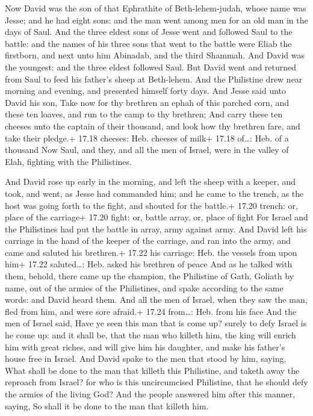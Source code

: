  Now David was the son of that Ephrathite of
Beth-lehem-judah, whose name was Jesse; and he had eight sons: and the
man went among men for an old man in the days of Saul.  And
the three eldest sons of Jesse went and followed Saul to the battle: and
the names of his three sons that went to the battle were Eliab the
firstborn, and next unto him Abinadab, and the third Shammah.
 And David was the youngest: and the three eldest followed
Saul.  But David went and returned from Saul to feed his
father's sheep at Beth-lehem.  And the Philistine drew near
morning and evening, and presented himself forty days.  And
Jesse said unto David his son, Take now for thy brethren an ephah of
this parched corn, and these ten loaves, and run to the camp to thy
brethren;  And carry these ten cheeses unto the captain of
their thousand, and look how thy brethren fare, and take their pledge.+
17.18 cheeses: Heb. cheeses of milk+ 17.18 of\ldots: Heb. of a thousand
 Now Saul, and they, and all the men of Israel, were in the
valley of Elah, fighting with the Philistines.

 And David rose up early in the morning, and left the
sheep with a keeper, and took, and went, as Jesse had commanded him; and
he came to the trench, as the host was going forth to the fight, and
shouted for the battle.+ 17.20 trench: or, place of the carriage+ 17.20
fight: or, battle array, or, place of fight  For Israel and
the Philistines had put the battle in array, army against army.
 And David left his carriage in the hand of the keeper of
the carriage, and ran into the army, and came and saluted his brethren.+
17.22 his carriage: Heb. the vessels from upon him+ 17.22 saluted\ldots:
Heb. asked his brethren of peace  And as he talked with
them, behold, there came up the champion, the Philistine of Gath,
Goliath by name, out of the armies of the Philistines, and spake
according to the same words: and David heard them.  And all
the men of Israel, when they saw the man, fled from him, and were sore
afraid.+ 17.24 from\ldots: Heb. from his face  And the men
of Israel said, Have ye seen this man that is come up? surely to defy
Israel is he come up: and it shall be, that the man who killeth him, the
king will enrich him with great riches, and will give him his daughter,
and make his father's house free in Israel.  And David
spake to the men that stood by him, saying, What shall be done to the
man that killeth this Philistine, and taketh away the reproach from
Israel? for who is this uncircumcised Philistine, that he should defy
the armies of the living God?  And the people answered him
after this manner, saying, So shall it be done to the man that killeth
him.

